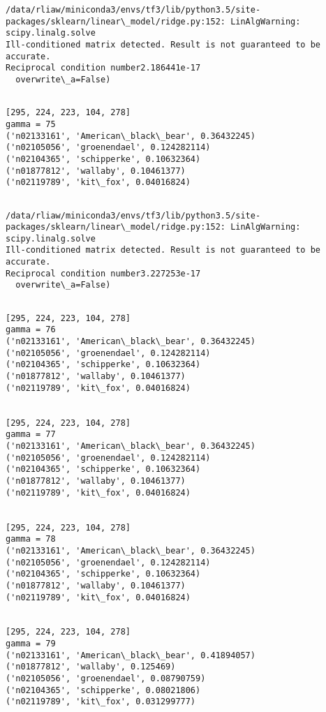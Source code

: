 \documentclass[11pt]{article}
\begin{document}
    \begin{Verbatim}[commandchars=\\\{\}]
/data/rliaw/miniconda3/envs/tf3/lib/python3.5/site-packages/sklearn/linear\_model/ridge.py:152: LinAlgWarning: scipy.linalg.solve
Ill-conditioned matrix detected. Result is not guaranteed to be accurate.
Reciprocal condition number2.186441e-17
  overwrite\_a=False)

    \end{Verbatim}

    \begin{Verbatim}[commandchars=\\\{\}]

[295, 224, 223, 104, 278]
gamma = 75
('n02133161', 'American\_black\_bear', 0.36432245)
('n02105056', 'groenendael', 0.124282114)
('n02104365', 'schipperke', 0.10632364)
('n01877812', 'wallaby', 0.10461377)
('n02119789', 'kit\_fox', 0.04016824)


    \end{Verbatim}

    \begin{Verbatim}[commandchars=\\\{\}]
/data/rliaw/miniconda3/envs/tf3/lib/python3.5/site-packages/sklearn/linear\_model/ridge.py:152: LinAlgWarning: scipy.linalg.solve
Ill-conditioned matrix detected. Result is not guaranteed to be accurate.
Reciprocal condition number3.227253e-17
  overwrite\_a=False)

    \end{Verbatim}

    \begin{Verbatim}[commandchars=\\\{\}]

[295, 224, 223, 104, 278]
gamma = 76
('n02133161', 'American\_black\_bear', 0.36432245)
('n02105056', 'groenendael', 0.124282114)
('n02104365', 'schipperke', 0.10632364)
('n01877812', 'wallaby', 0.10461377)
('n02119789', 'kit\_fox', 0.04016824)


[295, 224, 223, 104, 278]
gamma = 77
('n02133161', 'American\_black\_bear', 0.36432245)
('n02105056', 'groenendael', 0.124282114)
('n02104365', 'schipperke', 0.10632364)
('n01877812', 'wallaby', 0.10461377)
('n02119789', 'kit\_fox', 0.04016824)


[295, 224, 223, 104, 278]
gamma = 78
('n02133161', 'American\_black\_bear', 0.36432245)
('n02105056', 'groenendael', 0.124282114)
('n02104365', 'schipperke', 0.10632364)
('n01877812', 'wallaby', 0.10461377)
('n02119789', 'kit\_fox', 0.04016824)


[295, 224, 223, 104, 278]
gamma = 79
('n02133161', 'American\_black\_bear', 0.41894057)
('n01877812', 'wallaby', 0.125469)
('n02105056', 'groenendael', 0.08790759)
('n02104365', 'schipperke', 0.08021806)
('n02119789', 'kit\_fox', 0.031299777)


    \end{Verbatim}
\end{document}
